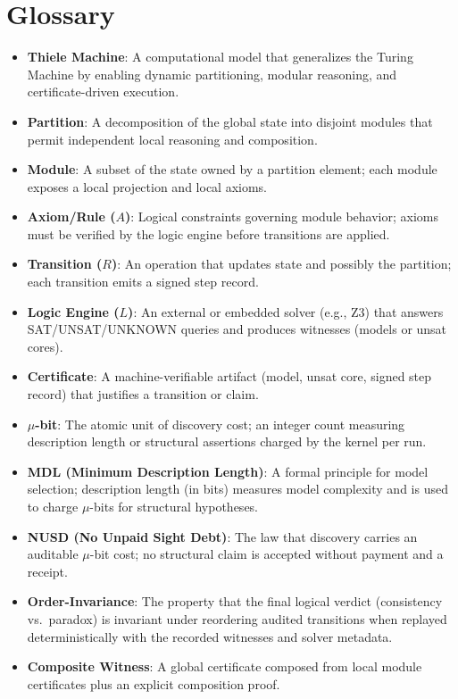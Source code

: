 \documentclass[11pt]{article}
\begin{document}
\section{Glossary}
\begin{itemize}
  \item \textbf{Thiele Machine}: A computational model that generalizes the Turing Machine by enabling dynamic partitioning, modular reasoning, and certificate-driven execution.
  \item \textbf{Partition}: A decomposition of the global state into disjoint modules that permit independent local reasoning and composition.
  \item \textbf{Module}: A subset of the state owned by a partition element; each module exposes a local projection and local axioms.
  \item \textbf{Axiom/Rule ($A$)}: Logical constraints governing module behavior; axioms must be verified by the logic engine before transitions are applied.
  \item \textbf{Transition ($R$)}: An operation that updates state and possibly the partition; each transition emits a signed step record.
  \item \textbf{Logic Engine ($L$)}: An external or embedded solver (e.g., Z3) that answers SAT/UNSAT/UNKNOWN queries and produces witnesses (models or unsat cores).
  \item \textbf{Certificate}: A machine-verifiable artifact (model, unsat core, signed step record) that justifies a transition or claim.
  \item \textbf{\(\mu\)-bit}: The atomic unit of discovery cost; an integer count measuring description length or structural assertions charged by the kernel per run.
  \item \textbf{MDL (Minimum Description Length)}: A formal principle for model selection; description length (in bits) measures model complexity and is used to charge \(\mu\)-bits for structural hypotheses.
  \item \textbf{NUSD (No Unpaid Sight Debt)}: The law that discovery carries an auditable \(\mu\)-bit cost; no structural claim is accepted without payment and a receipt.
  \item \textbf{Order-Invariance}: The property that the final logical verdict (consistency vs.\ paradox) is invariant under reordering audited transitions when replayed deterministically with the recorded witnesses and solver metadata.
  \item \textbf{Composite Witness}: A global certificate composed from local module certificates plus an explicit composition proof.

\end{itemize}
\end{document}
